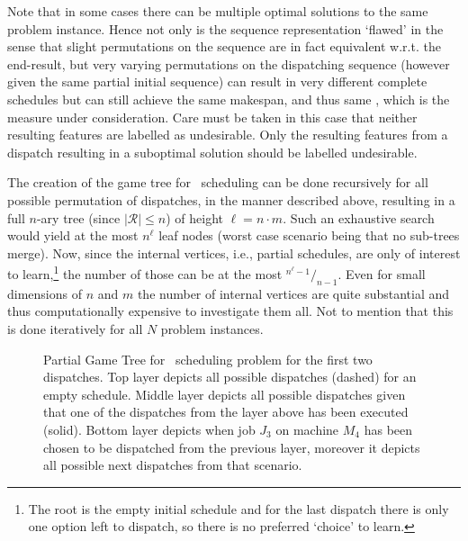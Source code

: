 Note that in some cases there can be multiple optimal solutions to the same problem instance. Hence not only is the sequence representation `flawed' in the sense that slight permutations on the sequence are in fact equivalent w.r.t. the end-result, but very varying permutations on the dispatching sequence (however given the same partial initial sequence) can result in very different complete schedules but can still achieve the same makespan, and thus same \fullnamerho, which is the measure under consideration. Care must be taken in this case that neither resulting features are labelled as undesirable. Only the resulting features from a dispatch resulting in a suboptimal solution should be labelled undesirable. 

The creation of the game tree for \jsp\ scheduling can be done recursively for all possible permutation of dispatches, in the manner described above, resulting in a full \mbox{$n$-ary} tree (since $|\mathcal{R}|\leq n$) of height $\ell=n\cdot m$. Such an exhaustive search would yield at the most $n^{\ell}$ leaf nodes (worst case scenario being that no sub-trees merge). Now, since the internal vertices, i.e., partial schedules, are only of interest to learn,\footnote{The root is the empty initial schedule and for the last dispatch there is only one option left to dispatch, so there is no preferred `choice' to learn.} the number of those can be at the most \mbox{${}^{n^{\ell}-1}/_{n-1}$}.
Even for small dimensions of $n$ and $m$ the number of internal vertices are quite substantial and thus computationally expensive to investigate them all. Not to mention that this is done iteratively for all $N$ problem instances.

\begin{figure}
\caption[Partial Game Tree for \JSP]{Partial Game Tree for \jsp\ scheduling problem for the first two dispatches. 
Top layer depicts all possible dispatches (dashed) for an empty schedule. 
Middle layer depicts all possible dispatches given that one of the dispatches from the layer above has been executed (solid). 
Bottom layer depicts when job $J_3$ on machine $M_4$ has been chosen to be dispatched from the previous layer, moreover it depicts all possible next dispatches from that scenario.}
\label{fig:jssp:gametree}
\end{figure}

